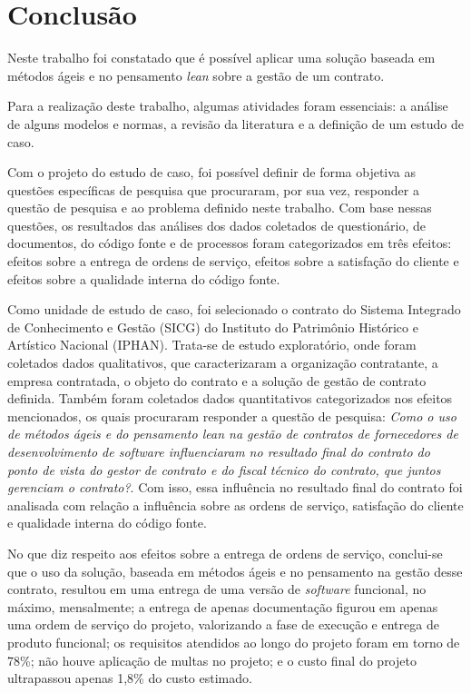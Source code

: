 \chapter[Conclusão]{Conclusão}

Neste trabalho foi constatado que é possível aplicar uma solução baseada em métodos ágeis e no pensamento \textit{lean} sobre a gestão de um contrato.
 
Para a realização deste trabalho, algumas atividades foram essenciais: a análise de alguns modelos e normas, a revisão da literatura e a definição de um estudo de caso.
 
Com o projeto do estudo de caso, foi possível definir de forma objetiva as questões específicas de pesquisa que procuraram, por sua vez, responder a questão de pesquisa e ao problema definido neste trabalho. Com base nessas questões, os resultados das análises dos dados coletados de questionário, de documentos, do código fonte e de processos foram categorizados em três efeitos: efeitos sobre a entrega de ordens de serviço, efeitos sobre a satisfação do cliente e efeitos sobre a qualidade interna do código fonte.
 
Como unidade de estudo de caso, foi selecionado o contrato do Sistema Integrado de Conhecimento e Gestão (SICG) do Instituto do Patrimônio Histórico e Artístico Nacional (IPHAN). Trata-se de estudo exploratório, onde foram coletados dados qualitativos, que caracterizaram a organização contratante, a empresa contratada, o objeto do contrato e a solução de gestão de contrato definida. Também foram coletados dados quantitativos categorizados nos efeitos mencionados, os quais procuraram responder a questão de pesquisa: \textit{ Como o uso de métodos ágeis e do pensamento \textit{lean} na gestão de contratos de fornecedores de desenvolvimento de \textit{software} influenciaram no resultado final do contrato do ponto de vista do gestor de contrato e do fiscal técnico do contrato, que juntos gerenciam o contrato?}. Com isso, essa influência no resultado final do contrato foi analisada com relação a influência sobre as ordens de serviço, satisfação do cliente e qualidade interna do código fonte.

No que diz respeito aos efeitos sobre a entrega de ordens de serviço, conclui-se que o uso da solução, baseada em métodos ágeis e no pensamento na gestão desse contrato, resultou em uma entrega de uma versão de \textit{software} funcional, no máximo, mensalmente; a entrega de apenas documentação figurou em apenas uma ordem de serviço do projeto, valorizando a fase de execução e entrega de produto funcional; os requisitos atendidos ao longo do projeto foram em torno de 78\%; não houve aplicação de multas no projeto; e o custo final do projeto ultrapassou apenas 1,8\% do custo estimado.
 

